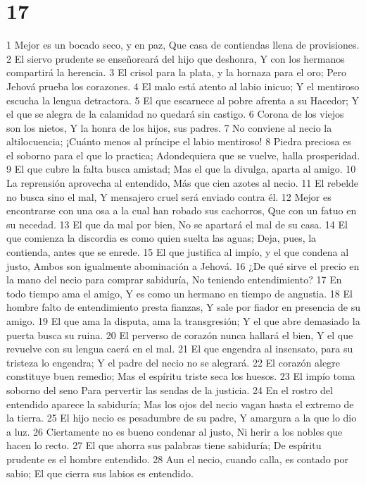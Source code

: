 \chapter{17}

1 Mejor es un bocado seco, y en paz,
Que casa de contiendas llena de provisiones.
2 El siervo prudente se enseñoreará del hijo que deshonra,
Y con los hermanos compartirá la herencia.
3 El crisol para la plata, y la hornaza para el oro;
Pero Jehová prueba los corazones.
4 El malo está atento al labio inicuo;
Y el mentiroso escucha la lengua detractora.
5 El que escarnece al pobre afrenta a su Hacedor;
Y el que se alegra de la calamidad no quedará sin castigo.
6 Corona de los viejos son los nietos,
Y la honra de los hijos, sus padres.
7 No conviene al necio la altilocuencia;
¡Cuánto menos al príncipe el labio mentiroso!
8 Piedra preciosa es el soborno para el que lo practica;
Adondequiera que se vuelve, halla prosperidad.
9 El que cubre la falta busca amistad;
Mas el que la divulga, aparta al amigo.
10 La reprensión aprovecha al entendido,
Más que cien azotes al necio.
11 El rebelde no busca sino el mal,
Y mensajero cruel será enviado contra él.
12 Mejor es encontrarse con una osa a la cual han robado sus cachorros,
Que con un fatuo en su necedad.
13 El que da mal por bien,
No se apartará el mal de su casa.
14 El que comienza la discordia es como quien suelta las aguas; 
Deja, pues, la contienda, antes que se enrede.
15 El que justifica al impío, y el que condena al justo,
Ambos son igualmente abominación a Jehová.
16 ¿De qué sirve el precio en la mano del necio para comprar sabiduría,
No teniendo entendimiento?
17 En todo tiempo ama el amigo,
Y es como un hermano en tiempo de angustia. 
18 El hombre falto de entendimiento presta fianzas,
Y sale por fiador en presencia de su amigo.
19 El que ama la disputa, ama la transgresión;
Y el que abre demasiado la puerta busca su ruina.
20 El perverso de corazón nunca hallará el bien,
Y el que revuelve con su lengua caerá en el mal.
21 El que engendra al insensato, para su tristeza lo engendra;
Y el padre del necio no se alegrará.
22 El corazón alegre constituye buen remedio;
Mas el espíritu triste seca los huesos.
23 El impío toma soborno del seno
Para pervertir las sendas de la justicia.
24 En el rostro del entendido aparece la sabiduría;
Mas los ojos del necio vagan hasta el extremo de la tierra.
25 El hijo necio es pesadumbre de su padre,
Y amargura a la que lo dio a luz.
26 Ciertamente no es bueno condenar al justo,
Ni herir a los nobles que hacen lo recto.
27 El que ahorra sus palabras tiene sabiduría;
De espíritu prudente es el hombre entendido.
28 Aun el necio, cuando calla, es contado por sabio;
El que cierra sus labios es entendido. 

